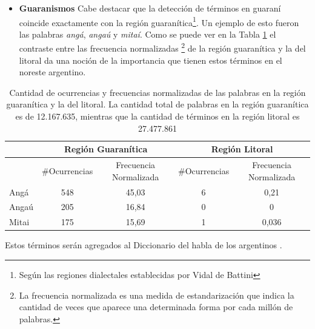 \begin{itemize}
  \blockquote[Formosa]{\textbf{Aijué}, encima me decís vieja, re que no pinta esto facundo jaja ya te dije como es la onda, fin }

  \blockquote[Formosa]{\textbf{Ains}, una mujer hablando de fútbol.}

  \blockquote[Corrientes]{Al fin una buena: hora libreeee! \textbf{Yirr} }

\item \textbf{Guaranismos}
\label{sub:guaranismos}
Cabe destacar que la detección de términos en guaraní coincide exactamente con la región  guaranítica\footnote{Según las regiones dialectales establecidas por Vidal de Battini\cite{vidal1964espanol}}.
Un ejemplo de esto fueron las palabras \textit{angá}, \textit{angaú} y \textit{mitaí}.
Como se puede ver en la Tabla \ref{tab:guaranismos} el contraste entre las frecuencia normalizadas \footnote{La frecuencia normalizada es una medida de estandarización que indica la cantidad de veces que aparece una determinada forma por cada millón de palabras.} de la región guaranítica y la del litoral da una noción de la importancia que tienen estos términos en el noreste argentino. 

\end{itemize}


\begin{table}
\centering

\begin{tabular}{|l|cc|cc|}
\hline
 & \multicolumn{2}{c}{Región Guaranítica} & \multicolumn{2}{c}{Región Litoral} \\ \hline
      & \#Ocurrencias & Frecuencia Normalizada & \#Ocurrencias & Frecuencia Normalizada \\
Angá  & 548              & 45,03       & 6             & 0,21                  \\
Angaú & 205               & 16,84   & 0               & 0                     \\
Mitai & 175              & 15,69      & 1              & 0,036    \\ \hline              
\end{tabular}

\caption{Cantidad de ocurrencias y frecuencias normalizadas de las palabras en la región guaranítica y la del litoral. La cantidad total de palabras en la región guaranítica es de 12.167.635, mientras que la cantidad de términos en la región litoral es 27.477.861 }
\label{tab:guaranismos}
\end{table}

Estos términos serán agregados al Diccionario del habla de los argentinos \cite{academia2008diccionario}.


